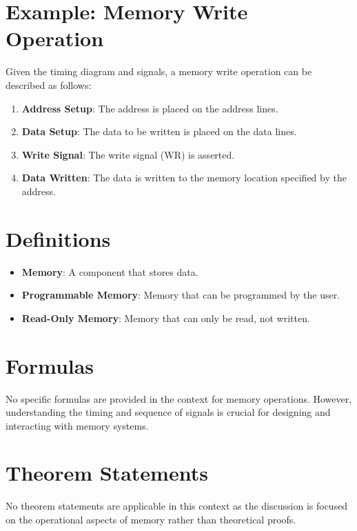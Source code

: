 \documentclass{article}
\begin{document}
\section{Example: Memory Write Operation}
Given the timing diagram and signals, a memory write operation can be described as follows:
\begin{enumerate}
    \item \textbf{Address Setup}: The address is placed on the address lines.
    \item \textbf{Data Setup}: The data to be written is placed on the data lines.
    \item \textbf{Write Signal}: The write signal (WR) is asserted.
    \item \textbf{Data Written}: The data is written to the memory location specified by the address.
\end{enumerate}

\section{Definitions}
\begin{itemize}
    \item \textbf{Memory}: A component that stores data.
    \item \textbf{Programmable Memory}: Memory that can be programmed by the user.
    \item \textbf{Read-Only Memory}: Memory that can only be read, not written.
\end{itemize}

\section{Formulas}
No specific formulas are provided in the context for memory operations. However, understanding the timing and sequence of signals is crucial for designing and interacting with memory systems.

\section{Theorem Statements}
No theorem statements are applicable in this context as the discussion is focused on the operational aspects of memory rather than theoretical proofs.
\end{document}
